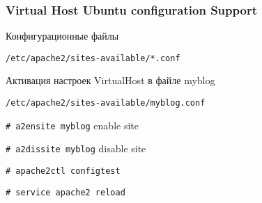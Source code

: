 \begin{frame}[fragile]
    \frametitle{Virtual Host Ubuntu configuration Support}
Конфигурационные файлы

\verb|/etc/apache2/sites-available/*.conf|

Активация настроек VirtualHost в файле myblog

\verb|/etc/apache2/sites-available/myblog.conf|

\verb|# a2ensite myblog| enable site

\verb|# a2dissite myblog| disable site

\verb|# apache2ctl configtest|

\verb|# service apache2 reload|
\end{frame}
